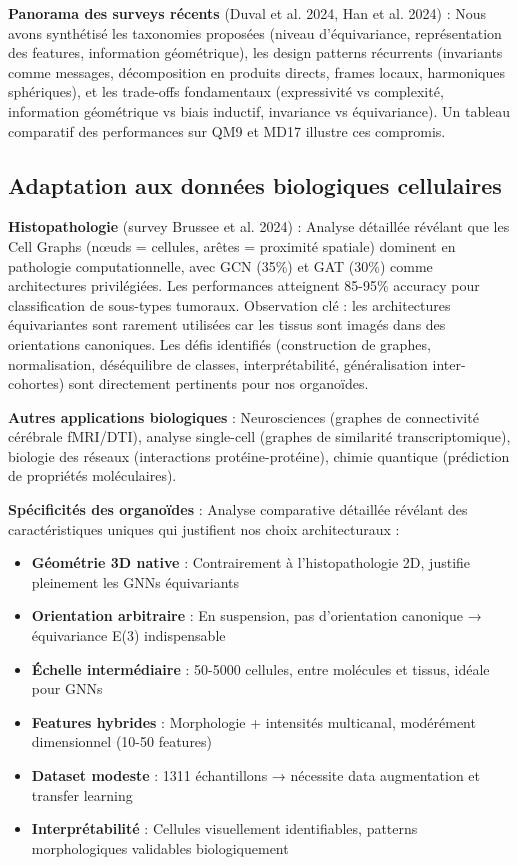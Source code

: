 \textbf{Panorama des surveys récents} (Duval et al. 2024, Han et al. 2024) : Nous avons synthétisé les taxonomies proposées (niveau d'équivariance, représentation des features, information géométrique), les design patterns récurrents (invariants comme messages, décomposition en produits directs, frames locaux, harmoniques sphériques), et les trade-offs fondamentaux (expressivité vs complexité, information géométrique vs biais inductif, invariance vs équivariance). Un tableau comparatif des performances sur QM9 et MD17 illustre ces compromis.

\subsection*{Adaptation aux données biologiques cellulaires}

\textbf{Histopathologie} (survey Brussee et al. 2024) : Analyse détaillée révélant que les Cell Graphs (nœuds = cellules, arêtes = proximité spatiale) dominent en pathologie computationnelle, avec GCN (35\%) et GAT (30\%) comme architectures privilégiées. Les performances atteignent 85-95\% accuracy pour classification de sous-types tumoraux. Observation clé : les architectures équivariantes sont rarement utilisées car les tissus sont imagés dans des orientations canoniques. Les défis identifiés (construction de graphes, normalisation, déséquilibre de classes, interprétabilité, généralisation inter-cohortes) sont directement pertinents pour nos organoïdes.

\textbf{Autres applications biologiques} : Neurosciences (graphes de connectivité cérébrale fMRI/DTI), analyse single-cell (graphes de similarité transcriptomique), biologie des réseaux (interactions protéine-protéine), chimie quantique (prédiction de propriétés moléculaires).

\textbf{Spécificités des organoïdes} : Analyse comparative détaillée révélant des caractéristiques uniques qui justifient nos choix architecturaux :
\begin{itemize}
    \item \textbf{Géométrie 3D native} : Contrairement à l'histopathologie 2D, justifie pleinement les GNNs équivariants
    \item \textbf{Orientation arbitraire} : En suspension, pas d'orientation canonique → équivariance E(3) indispensable
    \item \textbf{Échelle intermédiaire} : 50-5000 cellules, entre molécules et tissus, idéale pour GNNs
    \item \textbf{Features hybrides} : Morphologie + intensités multicanal, modérément dimensionnel (10-50 features)
    \item \textbf{Dataset modeste} : 1311 échantillons → nécessite data augmentation et transfer learning
    \item \textbf{Interprétabilité} : Cellules visuellement identifiables, patterns morphologiques validables biologiquement
\end{itemize}

